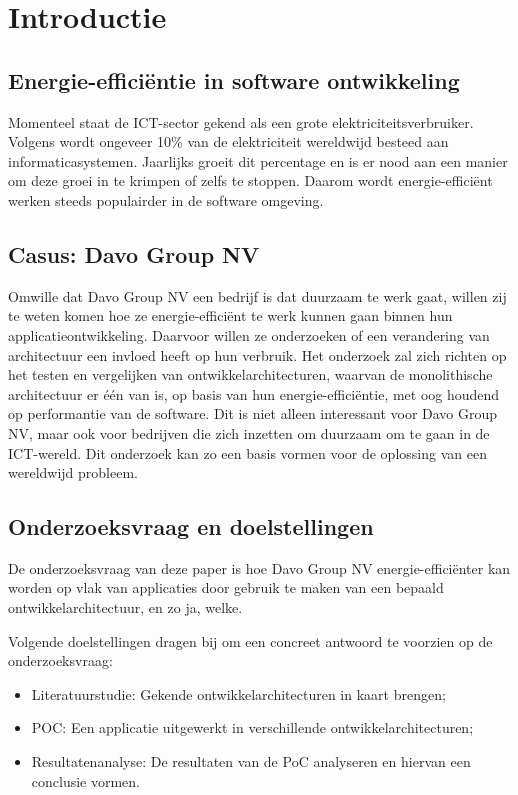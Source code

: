 
\section{Introductie}%
\label{sec:introductie}
\subsection{Energie-efficiëntie in software ontwikkeling}
Momenteel staat de ICT-sector gekend als een grote elektriciteitsverbruiker. Volgens \textcite{Gelenbe2023} wordt ongeveer 10\% van de elektriciteit wereldwijd besteed aan informaticasystemen. Jaarlijks groeit dit percentage en is er nood aan een manier om deze groei in te krimpen of zelfs te stoppen. Daarom wordt energie-efficiënt werken steeds populairder in de software omgeving.  

\subsection{Casus: Davo Group NV}
Omwille dat Davo Group NV een bedrijf is dat duurzaam te werk gaat, willen zij te weten komen hoe ze energie-efficiënt te werk kunnen gaan binnen hun applicatieontwikkeling. Daarvoor willen ze onderzoeken of een verandering van architectuur een invloed heeft op hun verbruik. Het onderzoek zal zich richten op het testen en vergelijken van ontwikkelarchitecturen, waarvan de monolithische architectuur er één van is, op basis van hun energie-efficiëntie, met oog houdend op performantie van de software. Dit is niet alleen interessant voor Davo Group NV, maar ook voor bedrijven die zich inzetten om duurzaam om te gaan in de ICT-wereld. Dit onderzoek kan zo een basis vormen voor de oplossing van een wereldwijd probleem.


\subsection{Onderzoeksvraag en doelstellingen}
De onderzoeksvraag van deze paper is hoe Davo Group NV energie-efficiënter kan worden op vlak van applicaties door gebruik te maken van een bepaald ontwikkelarchitectuur, en zo ja, welke.

Volgende doelstellingen dragen bij om een concreet antwoord te voorzien op de onderzoeksvraag:

\begin{itemize}
    \item Literatuurstudie: Gekende ontwikkelarchitecturen in kaart brengen;
    \item POC: Een applicatie uitgewerkt in verschillende ontwikkelarchitecturen;
    \item Resultatenanalyse: De resultaten van de PoC analyseren en hiervan een conclusie vormen.
\end{itemize}

